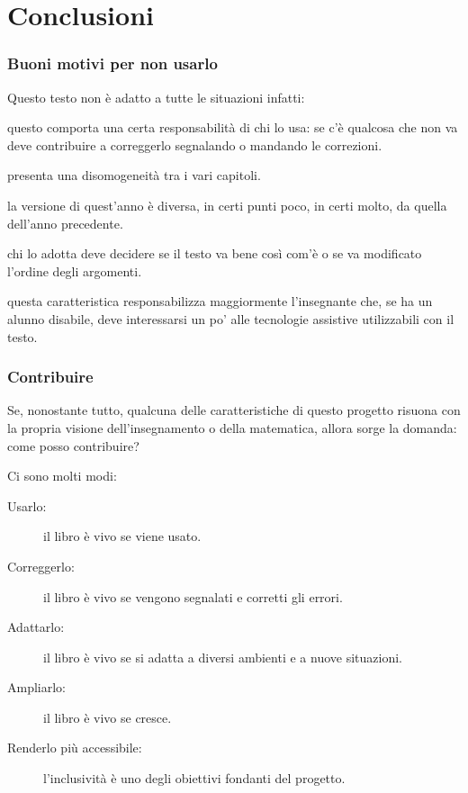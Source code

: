 \documentclass{beamer} %
\begin{document}
\section{Conclusioni}


\begin{frame}\frametitle{Buoni motivi per non usarlo}

Questo testo non è adatto a tutte le situazioni infatti:
\begin{description} [<+->]
\item [È libero:~~~~ ] questo comporta una certa responsabilità di chi 
lo usa:
se c'è qualcosa che non va deve contribuire a correggerlo segnalando o 
mandando le correzioni.
\item [È collaborativo: ] presenta una disomogeneità tra i vari capitoli.
\item [È evolutivo: ] la versione di quest'anno è diversa, in certi punti 
poco, in certi molto, da quella dell'anno precedente.
\item [È polimorfo: ] chi lo adotta deve decidere se il testo va bene così 
com'è o se va modificato l'ordine degli argomenti.
\item [È accessibile: ] questa caratteristica responsabilizza maggiormente 
l'insegnante che, se ha un alunno disabile, deve interessarsi un po' alle 
tecnologie assistive utilizzabili con il testo.
\end{description}

\end{frame}


\begin{frame}\frametitle{Contribuire}

Se, nonostante tutto, qualcuna delle caratteristiche di questo progetto 
risuona con la propria visione dell'insegnamento o della matematica, allora 
sorge la domanda: come posso contribuire?

Ci sono molti modi:
\begin{description}
\item [Usarlo:~~~~~~ ] il libro è vivo se viene usato.
\item [Correggerlo: ] il libro è vivo se vengono segnalati e corretti gli 
errori.
\item [Adattarlo:~~~ ] il libro è vivo se si adatta a diversi ambienti e a 
nuove situazioni.
\item [Ampliarlo:~~ ] il libro è vivo se cresce.
\item [Renderlo più accessibile: ] l'inclusività è uno degli obiettivi 
fondanti del progetto.
\end{description}

\end{frame}
\end{document}
